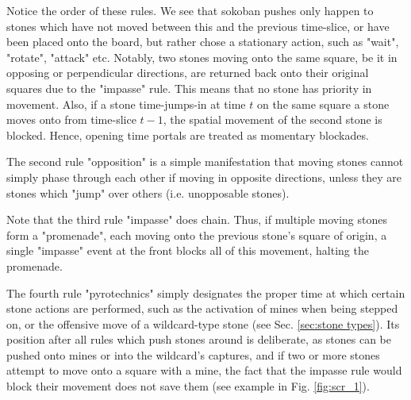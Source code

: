 \documentclass[12pt]{article}
\begin{document}
	Notice the order of these rules. We see that sokoban pushes only happen to stones which have not moved between this and the previous time-slice, or have been placed onto the board, but rather chose a stationary action, such as "wait", "rotate", "attack" etc. Notably, two stones moving onto the same square, be it in opposing or perpendicular directions, are returned back onto their original squares due to the "impasse" rule. This means that no stone has priority in movement. Also, if a stone time-jumps-in at time $t$ on the same square a stone moves onto from time-slice $t-1$, the spatial movement of the second stone is blocked. Hence, opening time portals are treated as momentary blockades.%
	
	
	The second rule "opposition" is a simple manifestation that moving stones cannot simply phase through each other if moving in opposite directions, unless they are stones which "jump" over others (i.e. unopposable stones).
	
	Note that the third rule "impasse" does chain. Thus, if multiple moving stones form a "promenade", each moving onto the previous stone's square of origin, a single "impasse" event at the front blocks all of this movement, halting the promenade.
	
	The fourth rule "pyrotechnics" simply designates the proper time at which certain stone actions are performed, such as the activation of mines when being stepped on, or the offensive move of a wildcard-type stone (see Sec. \ref{sec:stone types}). Its position after all rules which push stones around is deliberate, as stones can be pushed onto mines or into the wildcard's captures, and if two or more stones attempt to move onto a square with a mine, the fact that the impasse rule would block their movement does not save them (see example in Fig. \ref{fig:scr_1}).
	
\end{document}

